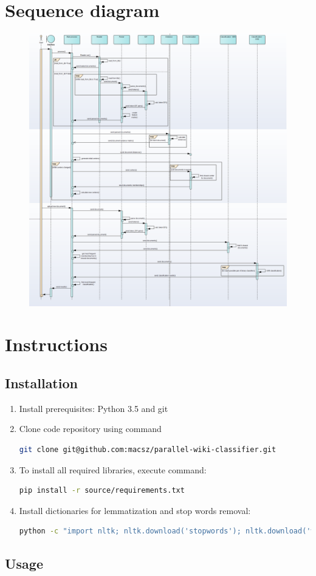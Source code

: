 \chapter{Sequence diagram} \label{appendix-sequence}
\begin{figure}[h]
	\begin{center}
		\includegraphics[width=1.2\linewidth]{images/diagrams/seq-full.png}
		\label{appendix-sequence-diagram}
	\end{center}
\end{figure}


\chapter{Instructions}
\section{Installation}
\begin{enumerate}
	\item Install prerequisites: Python 3.5 and git
	\item Clone code repository using command
\begin{lstlisting}[language=Bash, numbers=none]
git clone git@github.com:macsz/parallel-wiki-classifier.git
\end{lstlisting}
	\item To install all required libraries, execute command:
\begin{lstlisting}[language=Bash, numbers=none]
pip install -r source/requirements.txt
\end{lstlisting}
\item Install dictionaries for lemmatization and stop words removal:
\begin{lstlisting}[language=Bash, numbers=none]
python -c "import nltk; nltk.download('stopwords'); nltk.download('wordnet')"
\end{lstlisting}
\end{enumerate}
\section{Usage}